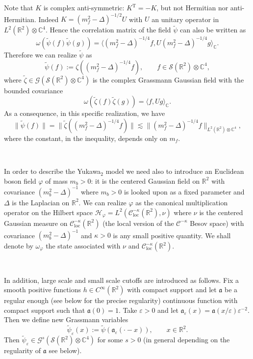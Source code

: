 \documentclass{article}
\newcommand{\Tau}{\mathrm{T}}
\newcommand{\assign}{:=}
\begin{document}
Note that $K$ is complex anti-symmetric: $K^{\Tau} = - K$, but not Hermitian
nor anti-Hermitian. Indeed $K = (m_f^2 - \Delta)^{- 1 / 2} U$ with $U$ an
unitary operator in $L^2 (\mathbb{R}^2) \otimes \mathbb{C}^4$. Hence the
correlation matrix of the field $\tilde{\psi}$ can also be written as
\[ \omega (\tilde{\psi} (f) \tilde{\psi} (g)) = \langle (m_f^2 - \Delta)^{- 1
   / 4} f, U (m_f^2 - \Delta)^{- 1 / 4} g \rangle_{\mathbb{C}} . \]
Therefore we can realize $\tilde{\psi}$ as
\[ \tilde{\psi} (f) \assign \zeta ((m_f^2 - \Delta)^{- 1 / 4} f), \qquad f \in
   \mathcal{S} (\mathbb{R}^2) \otimes \mathbb{C}^4, \]
where $\tilde{\zeta} \in \mathcal{G} (\mathcal{S} (\mathbb{R}^2) \otimes
\mathbb{C}^4)$ is the complex Grassmann Gaussian field with the bounded
covariance
\[ \omega (\tilde{\zeta} (f) \tilde{\zeta} (g)) = \langle f, U g
   \rangle_{\mathbb{C}} . \]
As a consequence, in this specific realization, we have
\begin{equation}
  \| \tilde{\psi} (f) \| = \| \tilde{\zeta} ((m_f^2 - \Delta)^{- 1 / 4} f) \|
  \lesssim \| (m_f^2 - \Delta)^{- 1 / 4} f \|_{L^2 (\mathbb{R}^2) \otimes
  \mathbb{C}^4}, \label{eq:dirac-reg}
\end{equation}
where the constant, in the inequality, depends only on $m_f$.

\

In order to describe the Yukawa$_2$ model we need also to introduce an
Euclidean boson field $\varphi$ of mass $m_b > 0$: it is the centered Gaussian
field on $\mathbb{R}^2$ with covariance $(m^2_b - \Delta)^{- 1}$ where $m_b >
0$ is looked upon as a fixed parameter and $\Delta$ is the Laplacian on
$\mathbb{R}^2$. We can realize $\varphi$ as the canonical multiplication
operator on the Hilbert space $\mathcal{H}_{\varphi} = L^2 \left(
\mathcal{C}^{- \kappa}_{\text{loc}} (\mathbb{R}^2), \nu \right)$ where $\nu$
is the centered Gaussian measure on $\mathcal{C}^{- \kappa}_{\text{loc}}
(\mathbb{R}^2)$ (the local version of the $\mathcal{C}^{- \kappa}$ Besov
space) with covariance $(m^2_b - \Delta)^{- 1}$ and $\kappa > 0$ is any small
positive quantity. We shall denote by $\omega_{\varphi}$ the state associated
with $\nu$ and $\mathcal{C}^{- \kappa}_{\text{loc}} (\mathbb{R}^2)$.

\

In addition, large scale and small scale cutoffs are introduced as follows.
Fix a smooth positive functions $h \in C^{\infty} (\mathbb{R}^2)$ with compact
support and let $\mathfrak{a}$ be a regular enough (see below for the precise
regularity) continuous function with compact support such that $\mathfrak{a}
(0) = 1$. Take $\varepsilon > 0$ and let $\mathfrak{a}_{\varepsilon} (x) =
\mathfrak{a} (x / \varepsilon) \varepsilon^{- 2}$. Then we define new
Grassmann variables
\[ \tilde{\psi}_{\varepsilon} (x) \assign \tilde{\psi}
   (\mathfrak{a}_{\varepsilon} (\cdot - x)), \qquad x \in \mathbb{R}^2 . \]
Then $\tilde{\psi}_{\varepsilon} \in \mathcal{G}^s (\mathcal{S} (\mathbb{R}^2)
\otimes \mathbb{C}^4)$ for some $s > 0$ (in general depending on the
regularity of $\mathfrak{a}$ see below).
\end{document}
